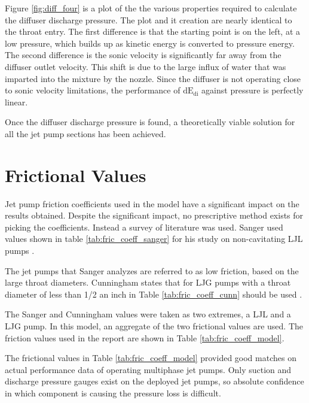 \documentclass[12 pt]{report}
\newcommand{\dedi}{$\mathrm{dE_{di}}$\xspace}  %
\begin{document}
Figure \ref{fig:diff_four} is a plot of the the various properties required to calculate the diffuser discharge pressure. The plot and it creation are nearly identical to the throat entry. The first difference is that the starting point is on the left, at a low pressure, which builds up as kinetic energy is converted to pressure energy. The second difference is the sonic velocity is significantly far away  from the diffuser outlet velocity. This shift is due to the large influx of water that was imparted into the mixture by the nozzle.  Since the diffuser is not operating close to sonic velocity limitations, the performance of \dedi against pressure is perfectly linear.

Once the diffuser discharge pressure is found, a theoretically viable solution for all the jet pump sections has been achieved.

\section{Frictional Values}

Jet pump friction coefficients used in the model have a significant impact on the results obtained. Despite the significant impact, no prescriptive method exists for picking the coefficients. Instead a survey of literature was used. Sanger used values shown in table \ref{tab:fric_coeff_sanger} for his study on non-cavitating LJL pumps \cite{sanger_non_cav}.



The jet pumps that Sanger analyzes are referred to as low friction, based on the large throat diameters. Cunningham states that for LJG pumps with a throat diameter of less than 1/2 an inch in Table \ref{tab:fric_coeff_cunn} should be used \cite{cunn_two}.



The Sanger and Cunningham values were taken as two extremes, a LJL and a LJG pump. In this model, an aggregate of the two frictional values are used. The friction values used in the report are shown in Table \ref{tab:fric_coeff_model}.



The frictional values in Table \ref{tab:fric_coeff_model} provided good matches on actual performance data of operating multiphase jet pumps. Only suction and discharge pressure gauges exist on the deployed jet pumps, so absolute confidence in which component is causing the pressure loss is difficult.
\end{document}
